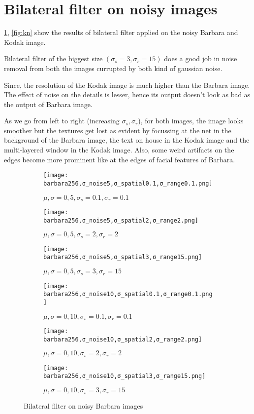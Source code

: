 \documentclass[a4paper, landscape]{article}
\begin{document}
\section{Bilateral filter on noisy images}
\ref{fig:bn}, \ref{fig:kn} show the results of bilateral filter applied on the noisy Barbara and Kodak image.

Bilateral filter of the biggest size $(\sigma_s=3, \sigma_r=15)$ does a good job in noise removal from both the images currupted by both kind of gaussian noise. 

Since, the resolution of the Kodak image is much higher than the Barbara image. The effect of noise on the details is lesser, hence its output doesn't look as bad as the output of Barbara image. 

As we go from left to right (increasing $\sigma_s, \sigma_r$), for both images, the image looks smoother but the textures get lost as evident by focussing at the net in the background of the Barbara image, the text on house in the Kodak image and the multi-layered window in  the Kodak image. Also, some weird artifacts on the edges become more prominent like at the edges of facial features of Barbara.
\begin{figure}
    \centering
    \begin{subfigure}{0.33\linewidth}
        \centering
        \texttt{[image: barbara256,σ\_noise5,σ\_spatial0.1,σ\_range0.1.png]}
        \caption{$\mu, \sigma = 0, 5, \sigma_s=0.1, \sigma_r=0.1$}
    \end{subfigure}
    \begin{subfigure}{0.33\linewidth}
        \centering
        \texttt{[image: barbara256,σ\_noise5,σ\_spatial2,σ\_range2.png]}
        \caption{$\mu, \sigma = 0, 5, \sigma_s=2, \sigma_r=2$}
    \end{subfigure}
    \begin{subfigure}{0.33\linewidth}
        \centering
        \texttt{[image: barbara256,σ\_noise5,σ\_spatial3,σ\_range15.png]}
        \caption{$\mu, \sigma = 0, 5, \sigma_s=3, \sigma_r=15$}
    \end{subfigure}
    \begin{subfigure}{0.33\linewidth}
        \centering
        \texttt{[image: barbara256,σ\_noise10,σ\_spatial0.1,σ\_range0.1.png]}
        \caption{$\mu, \sigma = 0, 10, \sigma_s=0.1, \sigma_r=0.1$}
    \end{subfigure}
    \begin{subfigure}{0.33\linewidth}
        \centering
        \texttt{[image: barbara256,σ\_noise10,σ\_spatial2,σ\_range2.png]}
        \caption{$\mu, \sigma = 0, 10, \sigma_s=2, \sigma_r=2$}
    \end{subfigure}
    \begin{subfigure}{0.33\linewidth}
        \centering
        \texttt{[image: barbara256,σ\_noise10,σ\_spatial3,σ\_range15.png]}
        \caption{$\mu, \sigma = 0, 10, \sigma_s=3, \sigma_r=15$}
    \end{subfigure}
    \caption{Bilateral filter on noisy Barbara images}
    \label{fig:bn}
\end{figure}
\end{document}
